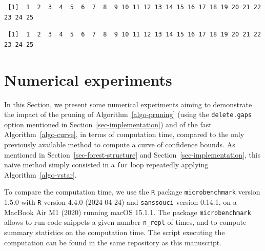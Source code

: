 \documentclass[
  11pt,
  a4paper,
]{article}
\newenvironment{Shaded}{}{}
\newcommand{\AttributeTok}[1]{\textcolor[rgb]{0.84,0.23,0.29}{#1}}
\newcommand{\ConstantTok}[1]{\textcolor[rgb]{0.00,0.36,0.77}{#1}}
\newcommand{\FunctionTok}[1]{\textcolor[rgb]{0.44,0.26,0.76}{#1}}
\newcommand{\NormalTok}[1]{\textcolor[rgb]{0.14,0.16,0.18}{#1}}
\newcommand{\OtherTok}[1]{\textcolor[rgb]{0.44,0.26,0.76}{#1}}
\newcommand{\SpecialCharTok}[1]{\textcolor[rgb]{0.00,0.36,0.77}{#1}}
\theoremstyle{plain}
\theoremstyle{plain}
\theoremstyle{definition}
\theoremstyle{plain}
\theoremstyle{definition}
\theoremstyle{remark}
\begin{document}
\begin{verbatim}
 [1]  1  2  3  4  5  6  7  8  9 10 11 12 13 14 15 16 17 18 19 20 21 22 23 24 25
\end{verbatim}

\begin{Shaded}
\end{Shaded}

\begin{verbatim}
 [1]  1  2  3  4  5  6  7  8  9 10 11 12 13 14 15 16 17 18 19 20 21 22 23 24 25
\end{verbatim}

\section{Numerical experiments}\label{sec-numeric}

In this Section, we present some numerical experiments aiming to
demonstrate the impact of the pruning of Algorithm~\ref{algo-pruning}
(using the \texttt{delete.gaps} option mentioned in
Section~\ref{sec-implementation}) and of the fast
Algorithm~\ref{algo-curve}, in terms of computation time, compared to
the only previously available method to compute a curve of confidence
bounds. As mentioned in Section~\ref{sec-forest-structure} and
Section~\ref{sec-implementation}, this naive method simply consisted in
a \texttt{for} loop repeatedly applying Algorithm~\ref{algo-vstar}.

To compare the computation time, we use the \texttt{R} package
\texttt{microbenchmark} version 1.5.0 \citep{microbenchmark} with
\texttt{R} version 4.4.0 (2024-04-24) and \texttt{sanssouci} version
0.14.1, on a MacBook Air M1 (2020) running macOS 15.1.1. The package
\texttt{microbenchmark} allows to run code snippets a given number
\texttt{n\_repl} of times, and to compute summary statistics on the
computation time. The script executing the computation can be found in
the same repository as this manuscript.
\end{document}
